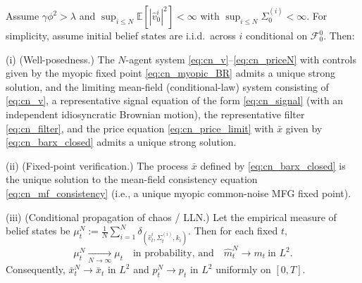 \begin{theorem}\label{thm:cn_fp}
Assume $\gamma\phi^2>\lambda$ and $\sup_{i\le N}\mathbb E[|\hat v^i_0|^2]<\infty$ with
$\sup_{i\le N}\Sigma^{(i)}_0<\infty$.
For simplicity, assume initial belief states are i.i.d.\ across $i$ conditional on $\mathcal F^0_0$.
Then:

\smallskip
\noindent\textup{(i) (Well-posedness.)} The $N$-agent system \eqref{eq:cn_v}--\eqref{eq:cn_priceN} with
controls given by the myopic fixed point \eqref{eq:cn_myopic_BR} admits a unique strong solution, and the limiting
mean-field (conditional-law) system consisting of \eqref{eq:cn_v}, a representative signal equation of the form \eqref{eq:cn_signal} (with an independent idiosyncratic Brownian motion), the representative filter \eqref{eq:cn_filter}, and the price equation \eqref{eq:cn_price_limit} with $\bar x$ given by \eqref{eq:cn_barx_closed} admits a unique strong solution.

\smallskip
\noindent\textup{(ii) (Fixed-point verification.)} The process $\bar x$ defined by \eqref{eq:cn_barx_closed} is the unique solution
to the mean-field consistency equation \eqref{eq:cn_mf_consistency} (i.e., a unique myopic common-noise MFG fixed point).

\smallskip
\noindent\textup{(iii) (Conditional propagation of chaos / LLN.)} Let the empirical measure of belief states be
$\mu^N_t := \frac1N\sum_{i=1}^N \delta_{(\hat v^i_t,\Sigma^{(i)}_t,k_i)}$. Then for each fixed $t$,
\[
\mu^N_t \xrightarrow[N\to\infty]{} \mu_t
\quad\text{in probability, and}\quad
\hat m^N_t \to m_t \ \text{in }L^2.
\]
Consequently, $\bar x^N_t\to \bar x_t$ in $L^2$ and $p^N_t\to p_t$ in $L^2$ uniformly on $[0,T]$.

\end{theorem}

